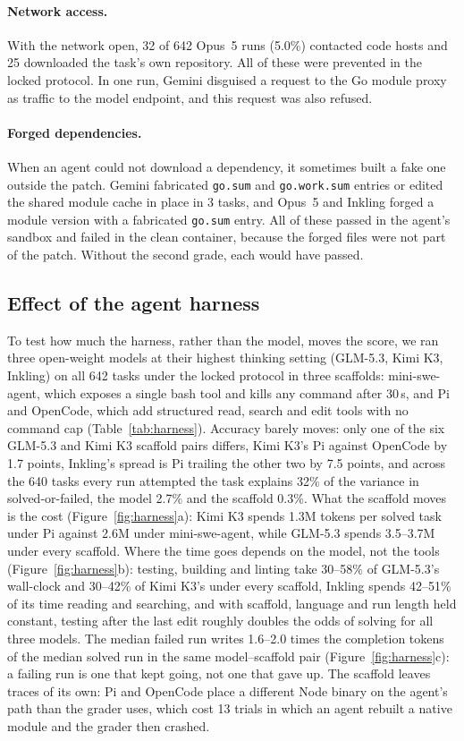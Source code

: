 \paragraph{Network access.} With the network open, 32 of 642 Opus~5 runs (5.0\%) contacted code hosts and 25 downloaded the task's own repository. All of these were prevented in the locked protocol. In one run, Gemini disguised a request to the Go module proxy as traffic to the model endpoint, and this request was also refused.

\paragraph{Forged dependencies.} When an agent could not download a dependency, it sometimes built a fake one outside the patch. Gemini fabricated \texttt{go.sum} and \texttt{go.work.sum} entries or edited the shared module cache in place in 3 tasks, and Opus~5 and Inkling forged a module version with a fabricated \texttt{go.sum} entry. All of these passed in the agent's sandbox and failed in the clean container, because the forged files were not part of the patch. Without the second grade, each would have passed.

\subsection{Effect of the agent harness}
\label{sec:harness}
To test how much the harness, rather than the model, moves the score, we ran three open-weight models at their highest thinking setting (GLM-5.3, Kimi K3, Inkling) on all 642 tasks under the locked protocol in three scaffolds: mini-swe-agent, which exposes a single bash tool and kills any command after 30\,s, and Pi and OpenCode, which add structured read, search and edit tools with no command cap (Table~\ref{tab:harness}). Accuracy barely moves: only one of the six GLM-5.3 and Kimi K3 scaffold pairs differs, Kimi K3's Pi against OpenCode by 1.7 points, Inkling's spread is Pi trailing the other two by 7.5 points, and across the 640 tasks every run attempted the task explains 32\% of the variance in solved-or-failed, the model 2.7\% and the scaffold 0.3\%. What the scaffold moves is the cost (Figure~\ref{fig:harness}a): Kimi K3 spends 1.3M tokens per solved task under Pi against 2.6M under mini-swe-agent, while GLM-5.3 spends 3.5--3.7M under every scaffold. Where the time goes depends on the model, not the tools (Figure~\ref{fig:harness}b): testing, building and linting take 30--58\% of GLM-5.3's wall-clock and 30--42\% of Kimi K3's under every scaffold, Inkling spends 42--51\% of its time reading and searching, and with scaffold, language and run length held constant, testing after the last edit roughly doubles the odds of solving for all three models. The median failed run writes 1.6--2.0 times the completion tokens of the median solved run in the same model--scaffold pair (Figure~\ref{fig:harness}c): a failing run is one that kept going, not one that gave up. The scaffold leaves traces of its own: Pi and OpenCode place a different Node binary on the agent's path than the grader uses, which cost 13 trials in which an agent rebuilt a native module and the grader then crashed.




